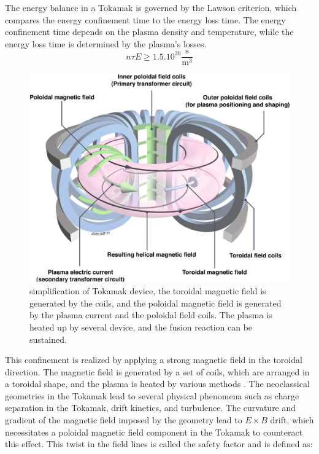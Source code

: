 \documentclass[11pt,a4paper,openany]{report}
\begin{document}
\begin{multicols}{2}
    The energy balance in a Tokamak is governed by the Lawson criterion, which compares the energy confinement time to the energy loss time. The energy confinement time depends on the plasma density and temperature, while the energy loss time is determined by the plasma's losses.
    $$n \tau E \ge 1.5.10^{20}{\frac {\mathrm {s} }{\mathrm {m} ^{3}}}$$
    \begin{figure}[H]
        \centering
        \includegraphics[width=1\linewidth]{./figures/tokamak.png}
        \caption{simplification of Tokamak device, the toroidal magnetic field is generated by the coils, and the poloidal magnetic field is generated by the plasma current and the poloidal field coils. The plasma is heated up by several device, and the fusion reaction can be sustained.}
        \label{}
    \end{figure}
    This confinement is realized by applying a strong magnetic field in the toroidal direction. The magnetic field is generated by a set of coils, which are arranged in a toroidal shape, and the plasma is heated by various methods \cite{Heating}. The neoclassical geometries in the Tokamak lead to several physical phenomena such as charge separation in the Tokamak, drift kinetics, and turbulence. The curvature and gradient of the magnetic field \cite{piel2018plasma} imposed by the geometry lead to $E \times B$ drift, which necessitates a poloidal magnetic field component in the Tokamak to counteract this effect. This twist in the field lines is called the safety factor and is defined as:


\end{multicols}
\end{document}
